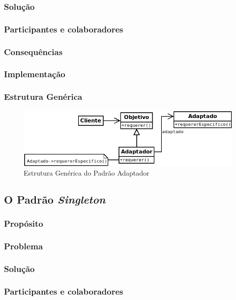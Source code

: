 \subsubsection{Solução}
\subsubsection{Participantes e colaboradores}
\subsubsection{Consequências}
\subsubsection{Implementação}
\subsubsection{Estrutura Genérica}

\begin{figure}[h]
\begin{center}
\includegraphics[scale=0.6]{adaptador.png}
\caption{Estrutura Genérica do Padrão Adaptador}\label{fig:adaptador}
\end{center}
\end{figure}

\subsection{O Padrão \textit{Singleton}}
\subsubsection{Propósito}
\subsubsection{Problema}
\subsubsection{Solução}
\subsubsection{Participantes e colaboradores}
